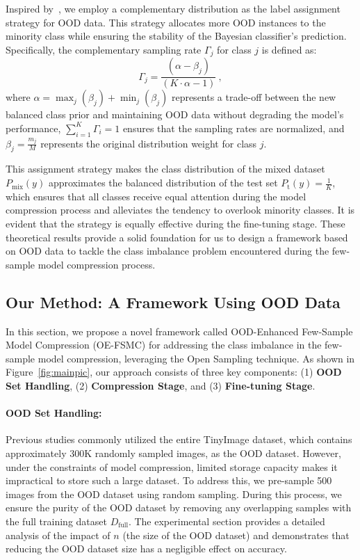 \documentclass[twoside,11pt]{article}
\begin{document}
Inspired by~\citep{wei2022open}, we employ a complementary distribution as the label assignment strategy for OOD data. This strategy allocates more OOD instances to the minority class while ensuring the stability of the Bayesian classifier’s prediction. Specifically, the complementary sampling rate $\Gamma_j$ for class $j$ is defined as: 
\begin{equation}
\label{eq:labelassign}
\Gamma_j = \frac{\left( \alpha - \beta_j \right)}{\left( K \cdot \alpha - 1 \right)}\ ,
\end{equation}
where $\alpha = \max_j(\beta_j) + \min_j(\beta_j)$ represents a trade-off between the new balanced class prior and maintaining OOD data without degrading the model's performance, $\sum_{i=1}^K \Gamma_i = 1$ ensures that the sampling rates are normalized, and $\beta_j = \frac{m_j}{M}$ represents the original distribution weight for class $j$. 

This assignment strategy makes the class distribution of the mixed dataset $P_{\mathrm{mix}}(y)$ approximates the balanced distribution of the test set $P_{\mathrm{t}}(y)=\frac{1}{K}$, which ensures that all classes receive equal attention during the model compression process and alleviates the tendency to overlook minority classes. It is evident that the strategy is equally effective during the fine-tuning stage. 
These theoretical results provide a solid foundation for us to design a framework based on OOD data to tackle the class imbalance problem encountered during the few-sample model compression process.



\subsection{Our Method: A Framework Using OOD Data
}

In this section, we propose a novel framework called OOD-Enhanced Few-Sample Model Compression (OE-FSMC) for addressing the class imbalance in the few-sample model compression, leveraging the Open Sampling technique. As shown in Figure~\ref{fig:mainpic}, our approach consists of three key components: (1) \textbf{OOD Set Handling}, (2) \textbf{Compression Stage}, and (3) \textbf{Fine-tuning Stage}.

\paragraph{OOD Set Handling:} Previous studies commonly utilized the entire TinyImage dataset, which contains approximately 300K randomly sampled images, as the OOD dataset. However, under the constraints of model compression, limited storage capacity makes it impractical to store such a large dataset. To address this, we pre-sample 500 images from the OOD dataset using random sampling. During this process, we ensure the purity of the OOD dataset by removing any overlapping samples with the full training dataset $ D_{\text{full}} $. The experimental section provides a detailed analysis of the impact of $ n $ (the size of the OOD dataset) and demonstrates that reducing the OOD dataset size has a negligible effect on accuracy.
\end{document}
